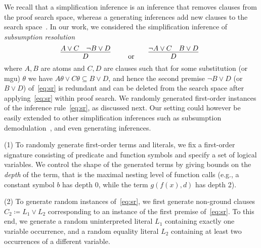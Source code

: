 We recall that a simplification inference is an inference
that removes clauses from the proof search space, whereas a generating
inferences add new clauses to the search space~\cite{Vampire13}. In our work, we
considered the simplification inference of 
\emph{subsumption resolution} 
\begin{equation}\label{eq:sr}
    \infer[]{
      D
      }{
      A\vee C
      &
      {\neg B \vee D}
    }
    \qquad \text{or}\qquad
    \infer[]{
      D
      }{
      \neg A\vee C
      &
      {B \vee D}
    }
      \end{equation}
      where $A,B$ are atoms and $C,D$ are clauses
      such that for some substitution (or mgu) $\theta$ we have $A\theta\vee
C\theta\subseteq B\vee D$, and hence the second premise $\neg B \vee
D$ (or $B \vee
D$) of~\eqref{eq:sr} is redundant and can  be deleted from the search
space after applying~\eqref{eq:sr} within proof search.
%
We randomly generated first-order instances of the inference rule~\eqref{eq:sr}, as
discussed next. Our setting could however be easily extended to other
simplification inferences such as subsumption demodulation~\cite{Rath20},
and even generating inferences.

\noindent (1) To randomly generate first-order terms and literals,
we fix  a first-order signature consisting of %
predicate and function symbols and specify a set of logical
variables. 
We control the shape of the generated terms
by giving bounds on the \emph{depth} of the term,
that is the maximal nesting level of function calls
(e.g., a constant symbol $b$ has depth 0, while the term $g(f(x),d)$ has depth 2).\smallskip


\noindent (2)  To generate random instances of~\eqref{eq:sr}, 
we first generate non-ground clauses $C_2 \coloneqq L_1 \lor L_2$
corresponding to an instance of the first premise of~\eqref{eq:sr}.
To this end, we generate a random uninterpreted literal $L_1$ containing exactly one variable occurrence,
and a random equality literal $L_2$ containing at least two occurrences of a different variable.\smallskip

